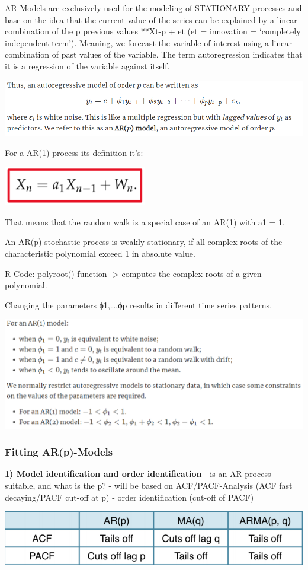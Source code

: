 \documentclass[
]{article}
\begin{document}
AR Models are exclusively used for the modeling of STATIONARY processes
and base on the idea that the current value of the series can be
explained by a linear combination of the p previous values **Xt-p + et
(et = innovation = `completely independent term'). Meaning, we forecast
the variable of interest using a linear combination of past values of
the variable. The term autoregression indicates that it is a regression
of the variable against itself.

\includegraphics[width=0.5\linewidth]{ar}

For a AR(1) process its definition it's:

\includegraphics[width=0.25\linewidth]{arp1}

That means that the random walk is a special case of an AR(1) with a1 =
1.

An AR(p) stochastic process is weakly stationary, if all complex roots
of the characteristic polynomial exceed 1 in absolute value.

R-Code: polyroot() function -\textgreater{} computes the complex roots
of a given polynomial.

Changing the parameters ϕ1,\ldots,ϕp results in different time series
patterns.

\includegraphics[width=0.5\linewidth]{ar1}

\hypertarget{fitting-arp-models}{%
\subsubsection{Fitting AR(p)-Models}\label{fitting-arp-models}}

\textbf{1) Model identification and order identification} - is an AR
process suitable, and what is the p? - will be based on
ACF/PACF-Analysis (ACF fast decaying/PACF cut-off at p) - order
identification (cut-off of PACF)

\includegraphics[width=1\linewidth]{ident}
\end{document}
